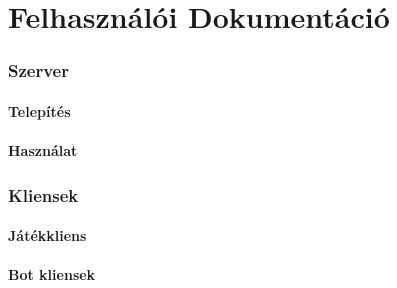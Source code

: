 \documentclass[twoside, a4paper, 12pt]{article}
\begin{document}
\part{Felhasználói Dokumentáció}
\section{Szerver}
\subsection{Telepítés}
\lipsum[6-7]
\subsection{Használat}
\lipsum[6-7]
\newpage
\section{Kliensek}
\subsection{Játékkliens}
\lipsum[1-2]
\subsection{Bot kliensek}
\lipsum[1-2]











































\newpage
\end{document}
